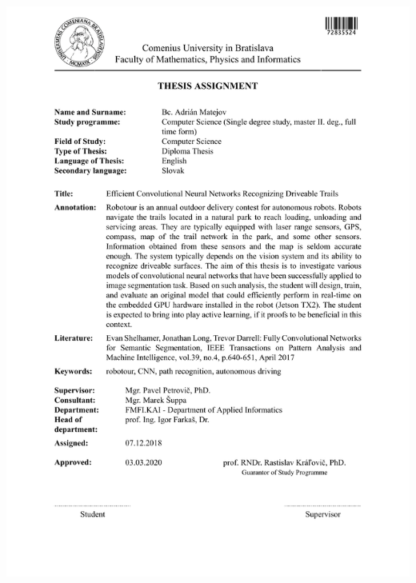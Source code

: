 \documentclass[12pt, oneside]{book}  %
\begin{document}
\newpage 
\thispagestyle{empty}
\hspace{-2cm}\includegraphics[width=1.1\textwidth]{assignments/zadanie_english}
\newpage 
\thispagestyle{empty}
\end{document}
